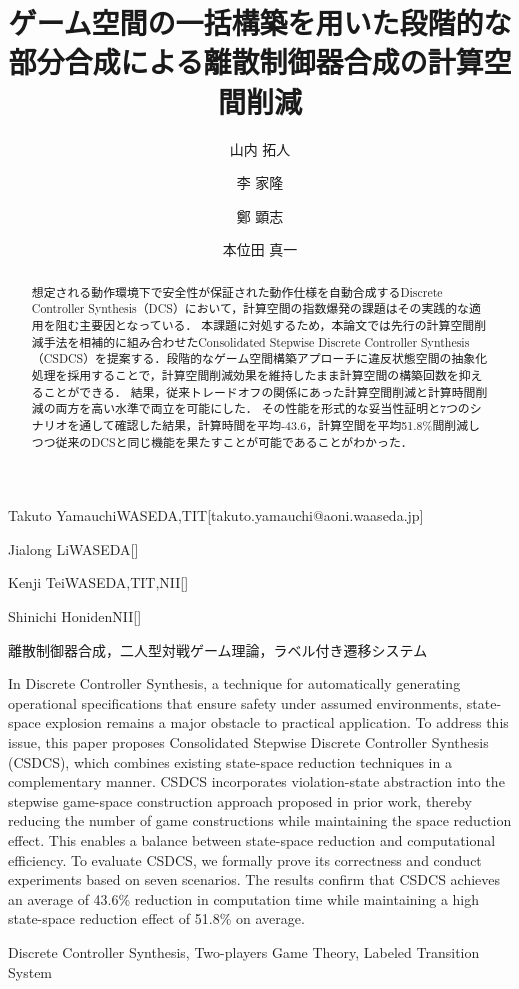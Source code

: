 \documentclass[submit]{ipsj}
\begin{document}
\title{ゲーム空間の一括構築を用いた段階的な部分合成による離散制御器合成の計算空間削減}



\author{山内 拓人}{Takuto Yamauchi}{WASEDA,TIT}[takuto.yamauchi@aoni.waaseda.jp]
\author{李 家隆}{Jialong Li}{WASEDA}[]
\author{鄭 顕志}{Kenji Tei}{WASEDA,TIT,NII}[]
\author{本位田 真一}{Shinichi Honiden}{NII}[]

\begin{abstract}
想定される動作環境下で安全性が保証された動作仕様を自動合成するDiscrete Controller Synthesis（DCS）において，計算空間の指数爆発の課題はその実践的な適用を阻む主要因となっている．
本課題に対処するため，本論文では先行の計算空間削減手法を相補的に組み合わせたConsolidated Stepwise Discrete Controller Synthesis（CSDCS）を提案する．段階的なゲーム空間構築アプローチに違反状態空間の抽象化処理を採用することで，計算空間削減効果を維持したまま計算空間の構築回数を抑えることができる．
結果，従来トレードオフの関係にあった計算空間削減と計算時間削減の両方を高い水準で両立を可能にした．
その性能を形式的な妥当性証明と7つのシナリオを通して確認した結果，計算時間を平均-43.6，計算空間を平均51.8\%間削減しつつ従来のDCSと同じ機能を果たすことが可能であることがわかった．
\end{abstract}
\begin{jkeyword}
離散制御器合成，二人型対戦ゲーム理論，ラベル付き遷移システム
\end{jkeyword}


\begin{eabstract}
In Discrete Controller Synthesis, a technique for automatically generating operational specifications that ensure safety under assumed environments, state-space explosion remains a major obstacle to practical application.
To address this issue, this paper proposes Consolidated Stepwise Discrete Controller Synthesis (CSDCS), which combines existing state-space reduction techniques in a complementary manner.
CSDCS incorporates violation-state abstraction into the stepwise game-space construction approach proposed in prior work, thereby reducing the number of game constructions while maintaining the space reduction effect. This enables a balance between state-space reduction and computational efficiency.
To evaluate CSDCS, we formally prove its correctness and conduct experiments based on seven scenarios. The results confirm that CSDCS achieves an average of 43.6\% reduction in computation time while maintaining a high state-space reduction effect of 51.8\% on average.
\end{eabstract}
\begin{ekeyword}
Discrete Controller Synthesis, Two-players Game Theory, Labeled Transition System
\end{ekeyword}
\end{document}

